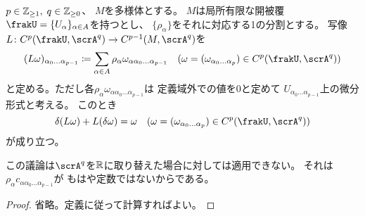 \documentclass[report]{jlreq}
\begin{document}
\begin{lemma}
    $p \in \mathbb{Z}_{\ge 1}, \; q \in \mathbb{Z}_{\ge 0}$、
    $M$を多様体とする。
    $M$は局所有限な開被覆$\frakU = \{U_\alpha\}_{\alpha \in A}$を持つとし、
    $\{ \rho_\alpha \}$をそれに対応する1の分割とする。
    写像$L \colon C^p(\frakU, \scrA^q) \to C^{p - 1}(M, \scrA^q)$を
    \begin{equation}
        (L\omega)_{\alpha_0 \dots \alpha_{p - 1}}
            \coloneqq
            \sum_{\alpha \in A}
            \rho_\alpha
            \omega_{\alpha \alpha_0 \dots \alpha_{p - 1}}
            \quad
            (\omega = (\omega_{\alpha_0 \dots \alpha_p})
            \in C^p(\frakU, \scrA^q))
    \end{equation}
    と定める。ただし各$\rho_\alpha \omega_{\alpha \alpha_0 \dots \alpha_{p - 1}}$は
    定義域外での値を$0$と定めて
    $U_{\alpha_0 \dots \alpha_{p - 1}}$上の微分形式と考える。
    このとき
    \begin{equation}
        \delta(L \omega) + L(\delta \omega) = \omega
            \quad
            (\omega = (\omega_{\alpha_0 \dots \alpha_p})
            \in C^p(\frakU, \scrA^q))
    \end{equation}
    が成り立つ。
\end{lemma}

\begin{remark}
    この議論は$\scrA^q$を$\mathbb{R}$に取り替えた場合に対しては適用できない。
    それは$\rho_\alpha c_{\alpha \alpha_0 \dots \alpha_{p - 1}}$が
    もはや定数ではないからである。
\end{remark}

\begin{proof}
    省略。定義に従って計算すればよい。
\end{proof}

\end{document}
